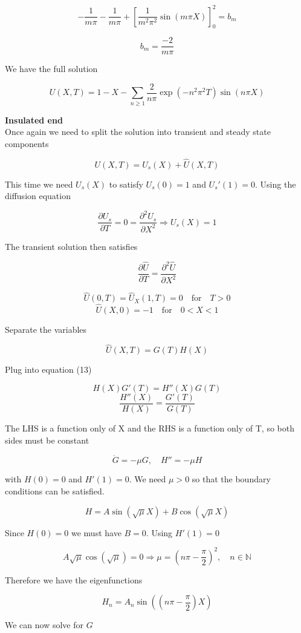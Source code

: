 \documentclass[12pt]{extarticle}
\begin{document}
$$-\frac{1}{m\pi}-\frac{1}{m\pi} + \left[\frac{1}{m^2\pi^2}\sin(m\pi X)\right]_0^2 = b_m$$

$$b_m = \frac{-2}{m\pi}$$

We have the full solution

$$U(X,T) = 1-X - \sum_{n \geq 1} \frac{2}{n\pi}\exp(-n^2\pi^2 T)\sin(n\pi X) $$

\textbf{Insulated end}\\

Once again we need to split the solution into transient and steady state components

$$U(X,T) = U_s(X)+\widehat{U}(X,T)$$

This time we need $U_s(X)$ to satisfy $U_s(0) = 1$ and $U_s'(1) = 0$. Using the diffusion equation

$$\frac{\partial U_s}{\partial T} = 0 = \frac{\partial^2 U_s}{\partial X^2} \Rightarrow U_s(X) = 1$$

The transient solution then satisfies

$$\frac{\partial \widehat{U}}{\partial T} = \frac{\partial^2 \widehat{U}}{\partial X^2}$$

$$\widehat{U}(0,T) = \widehat{U}_X(1,T) = 0 \quad \mathrm{for} \quad T>0$$
$$\widehat{U}(X,0) = -1 \quad \mathrm{for} \quad 0<X<1$$

Separate the variables

$$\widehat{U}(X,T) = G(T)H(X)$$

Plug into equation (13)

$$H(X)G'(T) = H''(X)G(T)$$
$$\frac{H''(X)}{H(X)} = \frac{G'(T)}{G(T)}$$

The LHS is a function only of X and the RHS is a function only of T, so both sides must be constant

$$\dot{G} = -\mu G, \quad H'' = -\mu H$$

with $H(0) = 0$ and $H'(1) = 0$. We need $\mu > 0 $ so that the boundary conditions can be  satisfied.

$$H = A\sin(\sqrt{\mu} X)+B\cos(\sqrt{\mu} X)$$

Since $H(0) = 0$ we must have $B=0$. Using $H'(1) = 0$

$$A\sqrt{\mu}\cos(\sqrt{\mu}) = 0 \Rightarrow \mu = \left(n\pi -\frac{\pi}{2}\right)^2, \quad n \in \mathbb{N}$$

Therefore we have the eigenfunctions 

$$H_n = A_n\sin\left(\left(n\pi -\frac{\pi}{2}\right) X\right)$$

We can now solve for $G$
\end{document}
